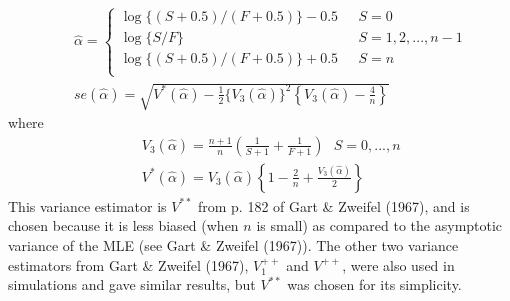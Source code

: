 \documentclass[12pt]{article}
\newcommand{\Ga}{\alpha}
\begin{document}
\begin{appendices}
\begin{eqnarray}
&&\hat{\Ga}=\left\{
\begin{array}{lll}
\log\{(S+0.5)/(F+0.5)\}-0.5&\ \ \ S=0\\
\log\{S/F\}&\ \ \ S=1,2,...,n-1\\
\log\{(S+0.5)/(F+0.5)\}+0.5&\ \ \ S=n\\
\end{array}
\right.\\ \label{eq:pseudoMLE1se}
&&se(\hat{\Ga})=\sqrt{V^*(\hat{\Ga})-\frac{1}{2}\{V_3(\hat{\Ga})\}^2\left\{V_3(\hat{\Ga})-\frac{4}{n}\right\}}
\end{eqnarray}
where
\begin{eqnarray}
&&V_3(\hat{\Ga})=\frac{n+1}{n}\left(\frac{1}{S+1}+\frac{1}{F+1}\right)\ \ \ S=0,...,n\\
\label{eq:pseudoMLE2}&&V^*(\hat{\Ga})=V_3(\hat{\Ga})\left\{1-\frac{2}{n}+\frac{V_3(\hat{\Ga})}{2}\right\}
\end{eqnarray}
This variance estimator is $V^{\ast\ast}$ from p. 182 of Gart \& Zweifel (1967), and is chosen because it is less biased (when $n$ is small) as compared to the asymptotic variance of the MLE (see Gart \& Zweifel (1967)). The other two variance estimators from Gart \& Zweifel (1967), $V_1^{++}$ and $V^{++}$, were also used in simulations and gave similar  results, but $V^{\ast\ast}$ was chosen for its simplicity.\bigskip\\


\end{appendices}
\end{document}
